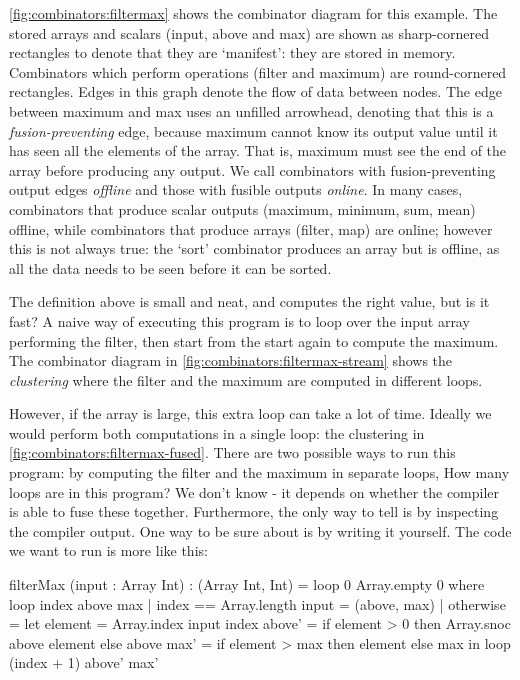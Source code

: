 \autoref{fig:combinators:filtermax} shows the combinator diagram for this example.
The stored arrays and scalars (input, above and max) are shown as sharp-cornered rectangles to denote that they are `manifest': they are stored in memory.
Combinators which perform operations (filter and maximum) are round-cornered rectangles.
Edges in this graph denote the flow of data between nodes.
The edge between maximum and max uses an unfilled arrowhead, denoting that this is a \emph{fusion-preventing} edge, because maximum cannot know its output value until it has seen all the elements of the array.
That is, maximum must see the end of the array before producing any output.
We call combinators with fusion-preventing output edges \emph{offline} and those with fusible outputs \emph{online}.
In many cases, combinators that produce scalar outputs (maximum, minimum, sum, mean) offline, while combinators that produce arrays (filter, map) are online; however this is not always true: the `sort' combinator produces an array but is offline, as all the data needs to be seen before it can be sorted.


The definition above is small and neat, and computes the right value, but is it fast?
A naive way of executing this program is to loop over the input array performing the filter, then start from the start again to compute the maximum.
The combinator diagram in \autoref{fig:combinators:filtermax-stream} shows the \emph{clustering} where the filter and the maximum are computed in different loops.

However, if the array is large, this extra loop can take a lot of time.
Ideally we would perform both computations in a single loop: the clustering in \autoref{fig:combinators:filtermax-fused}.
There are two possible ways to run this program: by computing the filter and the maximum in separate loops, 
How many loops are in this program? We don't know - it depends on whether the compiler is able to fuse these together.
Furthermore, the only way to tell is by inspecting the compiler output.
One way to be sure about is by writing it yourself.
The code we want to run is more like this:

\begin{code}
filterMax (input : Array Int) : (Array Int, Int)
 = loop 0 Array.empty 0
 where
  loop index above max
   | index == Array.length input
   = (above, max)
   | otherwise
   = let element = Array.index input index
         above'  = if element > 0
                   then Array.snoc above element
                   else above
         max'    = if element > max
                   then element
                   else max
     in  loop (index + 1) above' max'
\end{code}





